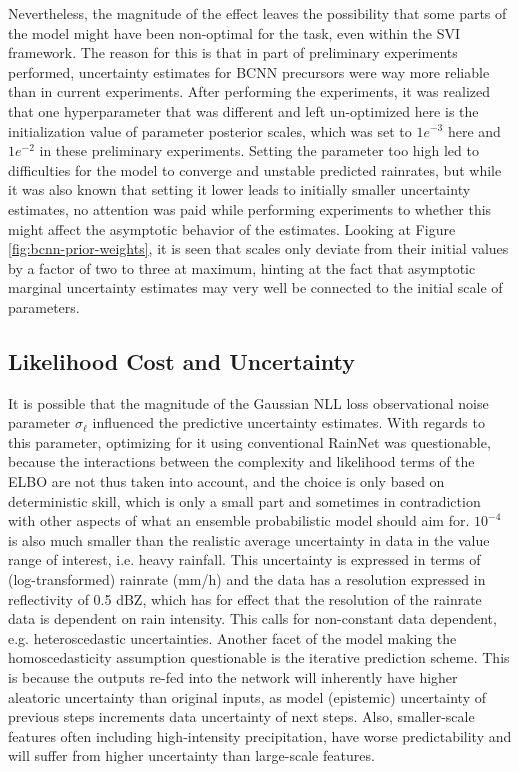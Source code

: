 Nevertheless, the magnitude of the effect leaves the possibility that some parts of the model might have been non-optimal for the task, even within the SVI framework. The reason for this is that in part of preliminary experiments performed, uncertainty estimates for BCNN precursors were way more reliable than in current experiments. After performing the experiments, it was realized that one hyperparameter that was different and left un-optimized here is the initialization value of parameter posterior scales, which was set to $1e^{-3}$ here and $1e^{-2}$ in these preliminary experiments. Setting the parameter too high led to difficulties for the model to converge and unstable predicted rainrates, but while it was also known that setting it lower leads to initially smaller uncertainty estimates, no attention was paid while performing experiments to whether this might affect the asymptotic behavior of the estimates. Looking at Figure \ref{fig:bcnn-prior-weights}, it is seen that scales only deviate from their initial values by a factor of two to three at maximum, hinting at the fact that asymptotic marginal uncertainty estimates may very well be connected to the initial scale of parameters. 

\subsection{Likelihood Cost and Uncertainty}

It is possible that the magnitude of the Gaussian NLL loss observational noise parameter $\sigma_\ell$ influenced the predictive uncertainty estimates.
With regards to this parameter, optimizing for it using conventional RainNet was questionable, because the interactions between the complexity and likelihood terms of the ELBO are not thus taken into account, and the choice is only based on deterministic skill, which is only a small part and sometimes in contradiction with other aspects of what an ensemble probabilistic model should aim for. $10^{-4}$ is also much smaller than the realistic average uncertainty in data in the value range of interest, i.e. heavy rainfall. This uncertainty is expressed in terms of (log-transformed) rainrate (mm/h) and the data has a resolution expressed in reflectivity of 0.5 dBZ, which has for effect that the resolution of the rainrate data is dependent on rain intensity. This calls for non-constant data dependent, e.g. heteroscedastic uncertainties. Another facet of the model making the homoscedasticity assumption questionable is the iterative prediction scheme. This is because the outputs re-fed into the network will inherently have higher aleatoric uncertainty than original inputs, as model (epistemic) uncertainty of previous steps increments data uncertainty of next steps. Also, smaller-scale features often including high-intensity precipitation, have worse predictability and will suffer from higher uncertainty than large-scale features.

